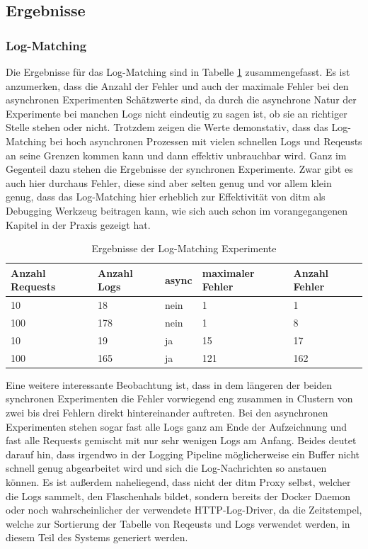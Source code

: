 \documentclass[12pt,a4paper]{report}
\begin{document}
\subsection{Ergebnisse}
\subsubsection{Log-Matching}
Die Ergebnisse für das Log-Matching sind in Tabelle \ref{tab:logs} zusammengefasst.
Es ist anzumerken, dass die Anzahl der Fehler und auch der maximale Fehler bei den asynchronen Experimenten Schätzwerte sind, da durch
die asynchrone Natur der Experimente bei manchen Logs nicht eindeutig zu sagen ist, ob sie an richtiger Stelle stehen oder nicht.
Trotzdem zeigen die Werte demonstativ, dass das Log-Matching bei hoch asynchronen Prozessen mit vielen schnellen Logs
und Reqeusts an seine Grenzen kommen kann und dann effektiv unbrauchbar wird. Ganz im Gegenteil dazu stehen die Ergebnisse der
synchronen Experimente. Zwar gibt es auch hier durchaus Fehler, diese sind aber selten genug und vor allem klein genug, dass das Log-Matching
hier erheblich zur Effektivität von ditm als Debugging Werkzeug beitragen kann, wie sich auch schon im vorangegangenen Kapitel in
der Praxis gezeigt hat.
\begin{table}[h]
	\centering
	\caption{Ergebnisse der Log-Matching Experimente}
	\label{tab:logs}
	\begin{tabular}{|l|l|l|l|l|}
		\hline
		Anzahl Requests & Anzahl Logs & async & maximaler Fehler & Anzahl Fehler \\ \hline
		10              & 18          & nein  & 1                & 1             \\ \hline
		100             & 178         & nein  & 1                & 8             \\ \hline
		10              & 19          & ja    & 15               & 17            \\ \hline
		100             & 165         & ja    & 121              & 162           \\ \hline
	\end{tabular}
\end{table}

Eine weitere interessante Beobachtung ist, dass in dem längeren der beiden synchronen Experimenten die Fehler vorwiegend eng zusammen in Clustern
von zwei bis drei Fehlern direkt hintereinander auftreten. Bei den asynchronen Experimenten stehen sogar fast alle Logs ganz am Ende der Aufzeichnung
und fast alle Requests gemischt mit nur sehr wenigen Logs am Anfang. Beides deutet darauf hin, dass irgendwo in der Logging Pipeline möglicherweise
ein Buffer nicht schnell genug abgearbeitet wird und sich die Log-Nachrichten so anstauen können. Es ist außerdem naheliegend, dass nicht der ditm Proxy
selbst, welcher die Logs sammelt, den Flaschenhals bildet, sondern bereits der Docker Daemon oder noch wahrscheinlicher der verwendete HTTP-Log-Driver,
da die Zeitstempel, welche zur Sortierung der Tabelle von Reqeusts und Logs verwendet werden, in diesem Teil des Systems generiert werden.
\end{document}
